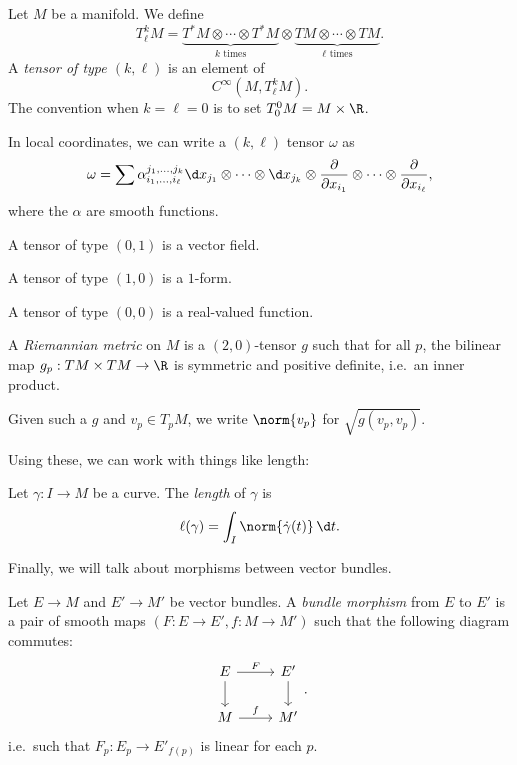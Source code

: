 \documentclass[a4paper]{article}
\begin{document}
\begin{defi}
  Let $M$ be a manifold. We define
  \[
    T_{\ell}^k M = \underbrace{T^*M \otimes \cdots \otimes T^* M}_{k \text{ times}} \otimes \underbrace{TM \otimes \cdots \otimes TM}_{\ell \text{ times}}.
  \]
  A \emph{tensor of type $(k, \ell)$} is an element of
  \[
    C^\infty (M, T_\ell^k M).
  \]
  The convention when $k = \ell = 0$ is to set $T_0^0 M = M \times \R$.
\end{defi}

In local coordinates, we can write a $(k, \ell)$ tensor $\omega$ as
\[
  \omega = \sum \alpha_{i_1, \ldots, i_\ell}^{j_1, \ldots, j_k} \d x_{j_1} \otimes \cdots \otimes \d x_{j_k} \otimes \frac{\partial}{\partial x_{i_1}} \otimes \cdots \otimes \frac{\partial}{\partial x_{i_\ell}},
\]
where the $\alpha$ are smooth functions.

\begin{eg}
  A tensor of type $(0, 1)$ is a vector field.

  A tensor of type $(1, 0)$ is a $1$-form.

  A tensor of type $(0, 0)$ is a real-valued function.
\end{eg}

\begin{defi}
  A \emph{Riemannian metric} on $M$ is a $(2, 0)$-tensor $g$ such that for all $p$, the bilinear map $g_p: T M \times T M \to \R$ is symmetric and positive definite, i.e.\ an inner product.

  Given such a $g$ and $v_p \in T_p M$, we write $\norm{v_p}$ for $\sqrt{g(v_p, v_p)}$.
\end{defi}

Using these, we can work with things like length:

\begin{defi}
  Let $\gamma: I \to M$ be a curve. The \emph{length} of $\gamma$ is
  \[
    \ell(\gamma)= \int_I \norm{\dot{\gamma}(t)} \,\d t.
  \]
\end{defi}

Finally, we will talk about morphisms between vector bundles.

\begin{defi}
  Let $E \to M$ and $E' \to M'$ be vector bundles. A \emph{bundle morphism} from $E$ to $E'$ is a pair of smooth maps $(F: E \to E', f: M \to M')$ such that the following diagram commutes:
  \[
    \begin{tikzcd}
      E \ar[d] \ar[r, "F"] & E' \ar[d]\\
      M \ar[r, "f"] & M'
    \end{tikzcd}.
  \]
  i.e.\ such that $F_p: E_p \to E'_{f(p)}$ is linear for each $p$.
\end{defi}
\end{document}
